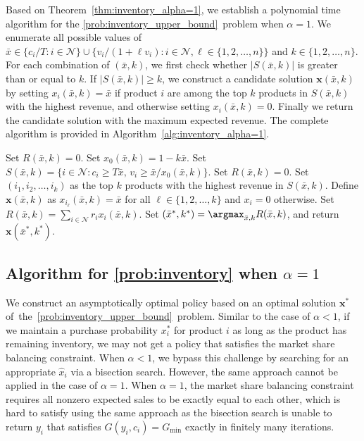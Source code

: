 \documentclass[mnsc,non-blindrev]{informs3}
\theoremstyle{definition}
\begin{document}
\begin{appendices}{\Large{}}
Based on Theorem~\ref{thm:inventory_alpha=1}, we establish a polynomial time algorithm for the \ref{prob:inventory_upper_bound}~problem when $\alpha=1$. We enumerate all possible values of \mbox{$\bar{x}\in\{c_i/T:i\in\mathcal{N}\}\cup\{v_i/(1+\ell v_i):i\in\mathcal{N},\ell\in\{1,2,\dots,n\}\}$} and $k\in\{1,2,\dots,n\}$. For each combination of $(\bar{x},k)$, we first check whether $|S(\bar{x},k)|$ is greater than or equal to $k$. If $|S(\bar{x},k)|\geq k$, we construct a candidate solution $\bm{x}(\bar{x},k)$ by setting $x_i(\bar{x},k)=\bar{x}$ if product $i$ are among the top $k$ products in $S(\bar{x},k)$ with the highest revenue, and otherwise setting $x_i(\bar{x},k)=0$. Finally we return the candidate solution with the maximum expected revenue. The complete algorithm is provided in Algorithm~\ref{alg:inventory_alpha=1}.

\begin{algorithm}[t]
\SingleSpacedXI
\caption{Algorithm for~the \ref{prob:inventory_upper_bound} problem~when $\alpha=1$}
\label{alg:inventory_alpha=1}
\begin{algorithmic}
\State Set $R(\bar{x},k)=0$.
\Else
\State Set $x_0(\bar{x},k)=1-k\bar{x}$.
\State Set $S(\bar{x},k)=\{i\in\mathcal{N}:c_i\geq T\bar{x},\,v_i\geq \bar{x}/x_0(\bar{x},k)\}$.
\State Set $R(\bar{x},k)=0$.
\Else
\State Set $(i_1,i_2,\dots,i_k)$ as the top $k$ products with the highest revenue in $S(\bar{x},k)$.
\State Define $\bm{x}(\bar{x},k)$ as $x_{i_\ell}(\bar{x},k)=\bar{x}$ for all $\ell\in\{1,2,\dots,k\}$ and $x_i=0$ otherwise.
\State Set $R(\bar{x},k)=\sum_{i\in\mathcal{N}}r_ix_i(\bar{x},k)$.
\EndIf
\EndIf
\EndFor
\EndFor
\State Set $(\bar{x}^*,k^*)=\argmax_{\bar{x},k}R(\bar{x},k)$, and return $\bm{x}(\bar{x}^*,k^*)$.
\end{algorithmic}
\end{algorithm}

\subsection{Algorithm for \ref{prob:inventory} when $\alpha=1$}

We construct an asymptotically optimal policy based on an optimal solution $\bm{x}^*$ of~the~\ref{prob:inventory_upper_bound}~problem. Similar to the case of $\alpha<1$, if we maintain a purchase probability $x_i^*$ for product $i$ as long as the product has remaining inventory, we may not get a policy that satisfies the market share balancing constraint. When $\alpha<1$, we bypass this challenge by searching for an appropriate $\hat{x}_i$ via a bisection search. However, the same approach cannot be applied in the case of $\alpha=1$. When $\alpha=1$, the market share balancing constraint requires all nonzero expected sales to be exactly equal to each other, which is hard to satisfy using the same approach as the bisection search is unable to return $y_i$ that satisfies $G(y_i,c_i)=G_{\min}$ exactly in finitely many iterations.


\end{appendices}
\end{document}
